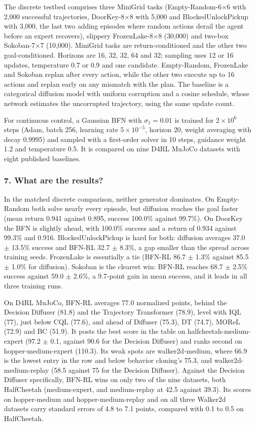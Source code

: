 \documentclass[11pt]{article}
\newcommand{\question}[1]{\subsubsection*{#1}}
\begin{document}
The discrete testbed comprises three MiniGrid tasks (Empty-Random-6\ensuremath{\times}6 with 2,000 successful trajectories, DoorKey-8\ensuremath{\times}8 with 5,000 and BlockedUnlockPickup with 3,000, the last two adding episodes where random actions derail the agent before an expert recovers), slippery FrozenLake-8\ensuremath{\times}8 (30,000) and two-box Sokoban-7\ensuremath{\times}7 (10,000). MiniGrid tasks are return-conditioned and the other two goal-conditioned. Horizons are 16, 32, 32, 64 and 32; sampling uses 12 or 16 updates, temperature 0.7 or 0.9 and one candidate. Empty-Random, FrozenLake and Sokoban replan after every action, while the other two execute up to 16 actions and replan early on any mismatch with the plan. The baseline is a categorical diffusion model with uniform corruption and a cosine schedule, whose network estimates the uncorrupted trajectory, using the same update count.

For continuous control, a Gaussian BFN with $\sigma_1 = 0.01$ is trained for $2\times 10^{6}$ steps (Adam, batch 256, learning rate $5\times 10^{-5}$, horizon 20, weight averaging with decay 0.9995) and sampled with a first-order solver in 10 steps, guidance weight 1.2 and temperature 0.5. It is compared on nine D4RL MuJoCo datasets with eight published baselines.

\question{7. What are the results?}

In the matched discrete comparison, neither generator dominates. On Empty-Random both solve nearly every episode, but diffusion reaches the goal faster (mean return 0.941 against 0.895, success 100.0\% against 99.7\%). On DoorKey the BFN is slightly ahead, with 100.0\% success and a return of 0.934 against 99.3\% and 0.916. BlockedUnlockPickup is hard for both: diffusion averages 37.0 \ensuremath{\pm} 13.5\% success and BFN-RL 32.7 \ensuremath{\pm} 8.3\%, a gap smaller than the spread across training seeds. FrozenLake is essentially a tie (BFN-RL 86.7 \ensuremath{\pm} 1.3\% against 85.5 \ensuremath{\pm} 1.0\% for diffusion). Sokoban is the clearest win: BFN-RL reaches 68.7 \ensuremath{\pm} 2.5\% success against 59.0 \ensuremath{\pm} 2.6\%, a 9.7-point gain in mean success, and it leads in all three training runs.

On D4RL MuJoCo, BFN-RL averages 77.0 normalized points, behind the Decision Diffuser (81.8) and the Trajectory Transformer (78.9), level with IQL (77), just below CQL (77.6), and ahead of Diffuser (75.3), DT (74.7), MOReL (72.9) and BC (51.9). It posts the best score in the table on halfcheetah-medium-expert (97.2 \ensuremath{\pm} 0.1, against 90.6 for the Decision Diffuser) and ranks second on hopper-medium-expert (110.3). Its weak spots are walker2d-medium, where 66.9 is the lowest entry in the row and below behavior cloning's 75.3, and walker2d-medium-replay (58.5 against 75 for the Decision Diffuser). Against the Decision Diffuser specifically, BFN-RL wins on only two of the nine datasets, both HalfCheetah (medium-expert, and medium-replay at 42.5 against 39.3). Its scores on hopper-medium and hopper-medium-replay and on all three Walker2d datasets carry standard errors of 4.8 to 7.1 points, compared with 0.1 to 0.5 on HalfCheetah.
\end{document}
